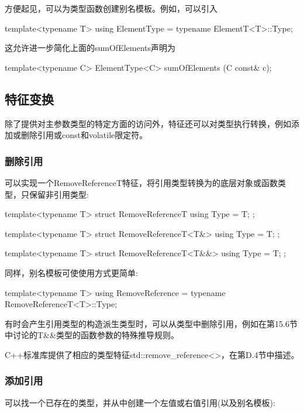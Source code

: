 方便起见，可以为类型函数创建别名模板。例如，可以引入

\begin{cpp}
template<typename T>
using ElementType = typename ElementT<T>::Type;
\end{cpp}

这允许进一步简化上面的sumOfElements声明为

\begin{cpp}
template<typename C>
ElementType<C> sumOfElements (C const& c);
\end{cpp}

\subsection{特征变换}

除了提供对主参数类型的特定方面的访问外，特征还可以对类型执行转换，例如添加或删除引用或const和volatile限定符。

\subsubsection{删除引用}

可以实现一个RemoveReferenceT特征，将引用类型转换为的底层对象或函数类型，只保留非引用类型:

\begin{cpp}
template<typename T>
struct RemoveReferenceT {
	using Type = T;
};

template<typename T>
struct RemoveReferenceT<T&> {
	using Type = T;
};

template<typename T>
struct RemoveReferenceT<T&&> {
	using Type = T;
};
\end{cpp}

同样，别名模板可使使用方式更简单:

\begin{cpp}
template<typename T>
using RemoveReference = typename RemoveReferenceT<T>::Type;
\end{cpp}

有时会产生引用类型的构造派生类型时，可以从类型中删除引用，例如在第15.6节中讨论的T\&\&类型的函数参数的特殊推导规则。

C++标准库提供了相应的类型特征std::remove\_reference<>，在第D.4节中描述。

\subsubsection{添加引用}

可以找一个已存在的类型，并从中创建一个左值或右值引用(以及别名模板):

